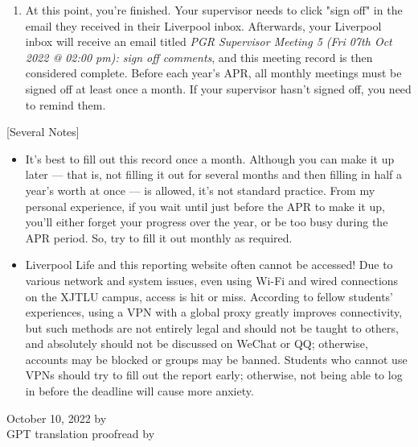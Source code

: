 \begin{enumerate}
    \item At this point, you're finished. Your supervisor needs to click "sign off" in the email they received in their Liverpool inbox. Afterwards, your Liverpool inbox will receive an email titled \textit{PGR Supervisor Meeting 5 (Fri 07th Oct 2022 @ 02:00 pm): sign off comments}, and this meeting record is then considered complete. Before each year's APR, all monthly meetings must be signed off at least once a month. If your supervisor hasn't signed off, you need to remind them.
\end{enumerate}

\vspace{5mm}
[Several Notes]
\begin{itemize}
    \item It's best to fill out this record once a month. Although you can make it up later — that is, not filling it out for several months and then filling in half a year's worth at once — is allowed, it's not standard practice. From my personal experience, if you wait until just before the APR to make it up, you'll either forget your progress over the year, or be too busy during the APR period. So, try to fill it out monthly as required.
    \item Liverpool Life and this reporting website often cannot be accessed! Due to various network and system issues, even using Wi-Fi and wired connections on the XJTLU campus, access is hit or miss. According to fellow students' experiences, using a VPN with a global proxy greatly improves connectivity, but such methods are not entirely legal and should not be taught to others, and absolutely should not be discussed on WeChat or QQ; otherwise, accounts may be blocked or groups may be banned. Students who cannot use VPNs should try to fill out the report early; otherwise, not being able to log in before the deadline will cause more anxiety.
\end{itemize}

\begin{flushright}
    October 10, 2022 by \Wu \\
    GPT translation proofread by \Shiyao
    \end{flushright}